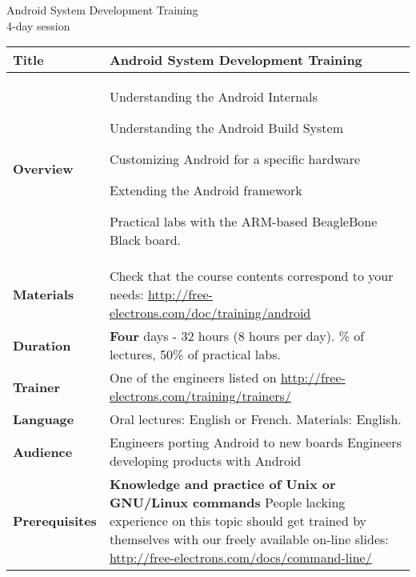 \documentclass[a4paper,12pt,obeyspaces,spaces,hyphens]{article}
\begin{document}
\thispagestyle{fancy}

\setlength{\arrayrulewidth}{0.8pt}

\begin{center}
\LARGE
Android System Development Training\\
\large
4-day session
\end{center}
\vspace{1cm}

\small
{}

 {
  \begin{tabularx}{\textwidth}{|g|h|}
    {\bf Title} & {\bf Android System Development Training}\\
    \hline

    {\bf Overview} &
    Understanding the Android Internals \par
    Understanding the Android Build System \par
    Customizing Android for a specific hardware \par
    Extending the Android framework \par
    Practical labs with the ARM-based BeagleBone Black board. \\
    \hline
    {\bf Materials} &
    Check that the course contents correspond to your needs:
    \url{http://free-electrons.com/doc/training/android} \\
    \hline

    {\bf Duration} & {\bf Four} days - 32 hours (8 hours per day).
    \% of lectures, 50\% of practical labs. \\
    \hline

    {\bf Trainer} & One of the engineers listed on
    \newline \url{http://free-electrons.com/training/trainers/}\\
    \hline

    {\bf Language} & Oral lectures: English or French.
    \newline Materials: English.\\
    \hline

    {\bf Audience} & Engineers porting Android to new boards
    \newline Engineers developing products with Android \\
    \hline

    {\bf Prerequisites} & {\bf Knowledge and practice of Unix or
      GNU/Linux commands}
    \newline People lacking experience on this topic should get
    trained by themselves with our freely available on-line slides:
    \newline \url{http://free-electrons.com/docs/command-line/} \vspace{1em}
     \\
    \hline
  \end{tabularx}

}
\end{document}
